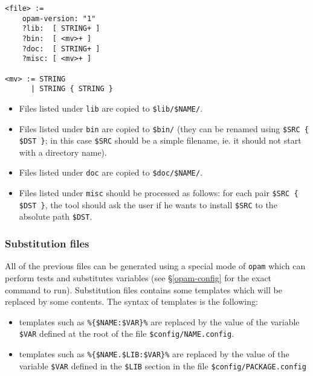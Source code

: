 \documentclass[a4paper,11pt]{article}
\begin{document}
{\small
\begin{Verbatim}[frame=single]
<file> :=
    opam-version: "1"
    ?lib:  [ STRING+ ]
    ?bin:  [ <mv>+ ]
    ?doc:  [ STRING+ ]
    ?misc: [ <mv>+ ]

<mv> := STRING
      | STRING { STRING }
\end{Verbatim}
}

\begin{itemize}
\item Files listed under {\tt lib} are copied to \verb+$lib/$NAME/+.
\item Files listed under {\tt bin} are copied to \verb+$bin/+ (they
  can be renamed using \verb+$SRC { $DST }+; in this case \verb+$SRC+
  should be a simple filename, ie. it should not start with a
  directory name).
\item Files listed under {\tt doc} are copied to \verb+$doc/$NAME/+.
\item Files listed under {\tt misc} should be processed as follows:
  for each pair \verb+$SRC { $DST }+, the tool should ask the user if
  he wants to install \verb+$SRC+ to the absolute path \verb+$DST+.
\end{itemize}

\subsubsection{Substitution files}
\label{subst}

All of the previous files can be generated using a special mode of
{\tt opam} which can perform tests and substitutes variables (see
\S\ref{opam-config} for the exact command to run). Substitution files
contains some templates which will be replaced by some contents. The
syntax of templates is the following:

\begin{itemize}

\item templates such as \verb+%{$NAME:$VAR}%+ are replaced by the value
  of the variable \verb+$VAR+ defined at the root of the file
  \verb+$config/NAME.config+.

\item templates such as \verb+%{$NAME.$LIB:$VAR}%+ are replaced by the
  value of the variable \verb+$VAR+ defined in the \verb+$LIB+ section
  in the file \verb+$config/PACKAGE.config+


\end{itemize}
\end{document}
